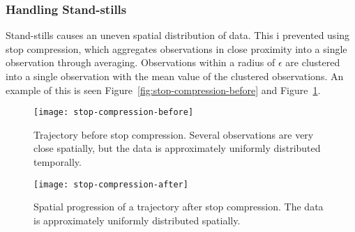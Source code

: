 \subsubsection{Handling Stand-stills}\label{sec:stop-compression}
Stand-stills causes an uneven spatial distribution of data. This i
prevented using stop compression, which aggregates observations in close proximity into a
single observation through averaging. Observations within a radius of
$\epsilon$ are clustered into a single observation with the mean value of
the clustered observations. An example of this is seen
Figure~\ref{fig:stop-compression-before} and Figure~\ref{fig:stop-compression-after}.
\begin{figure}
  \begin{minipage}{.46\textwidth}
    \texttt{[image: stop-compression-before]}
    \caption{Trajectory before stop compression. Several observations
      are very close spatially, but the data is
      approximately uniformly distributed temporally. }\label{fig:stop-compression-before}
  \end{minipage}
  \hspace{5pt} 
  \begin{minipage}{.46\textwidth}
    \texttt{[image: stop-compression-after]}
    \caption{Spatial progression of a trajectory
      after stop compression. The data is
      approximately uniformly distributed spatially.}\label{fig:stop-compression-after}
  \end{minipage}
\end{figure}

